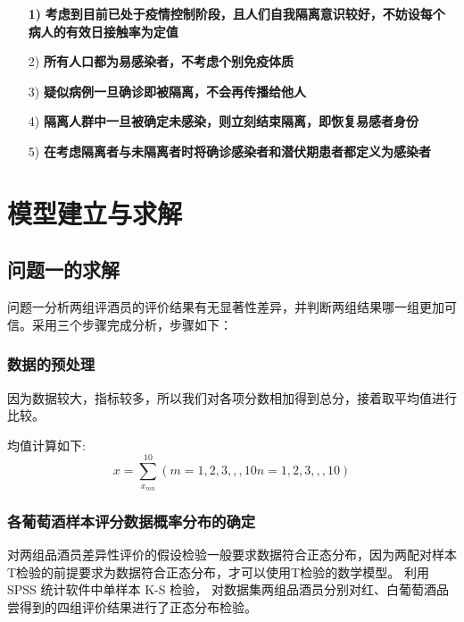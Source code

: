 \documentclass[UTF8]{ctexart}
\begin{document}
\begin{itemize}
	\item [\bf{1)}]\bf{考虑到目前已处于疫情控制阶段，且人们自我隔离意识较好，不妨设每个病人的有效日接触率为定值}
	\item [2)]\bf{所有人口都为易感染者，不考虑个别免疫体质}
	\item [3)]\bf{疑似病例一旦确诊即被隔离，不会再传播给他人}
	\item [4)]\bf{隔离人群中一旦被确定未感染，则立刻结束隔离，即恢复易感者身份}
	\item [5)]\bf{在考虑隔离者与未隔离者时将确诊感染者和潜伏期患者都定义为感染者}

\end{itemize}



\section{模型建立与求解}
\subsection{问题一的求解}
问题一分析两组评酒员的评价结果有无显著性差异，并判断两组结果哪一组更加可信。采用三个步骤完成分析，步骤如下：


\subsubsection{数据的预处理}
因为数据较大，指标较多，所以我们对各项分数相加得到总分，接着取平均值进行比较。

均值计算如下:
\begin{equation}
	x = \sum_{x_{mn}}^{10}(m = 1,2,3,,,10  n = 1,2,3,,,10)
\end{equation}

\subsubsection{各葡萄酒样本评分数据概率分布的确定}
对两组品酒员差异性评价的假设检验一般要求数据符合正态分布，因为两配对样本T检验的前提要求为数据符合正态分布，才可以使用T检验的数学模型。
利用 SPSS 统计软件中单样本 K-S 检验\cite{young1977proof}， 对数据集两组品酒员分别对红、白葡萄酒品尝得到的四组评价结果进行了正态分布检验。

\end{document}
